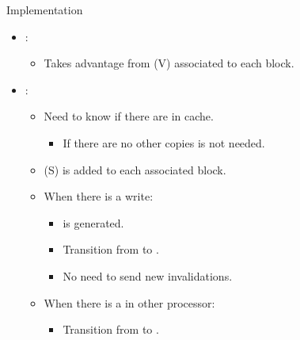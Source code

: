 \begin{frame}[t]{Implementation}
\begin{itemize}
  \item {}:
    \begin{itemize}
      \item Takes advantage from  (V) associated to each block.
    \end{itemize}

  \item {}:
    \begin{itemize}
      \item Need to know if there are  in cache.
        \begin{itemize}
          \item If there are no other copies  is not needed.
        \end{itemize}

      \item {} (S) is added to each associated block.

      \item When there is a write:
        \begin{itemize}
          \item {} is generated.
          \item Transition from  to .
          \item No need to send new invalidations.
        \end{itemize}

      \item When there is a  in other processor:
        \begin{itemize}
          \item Transition from  to .
        \end{itemize}
    \end{itemize}
\end{itemize}
\end{frame}

